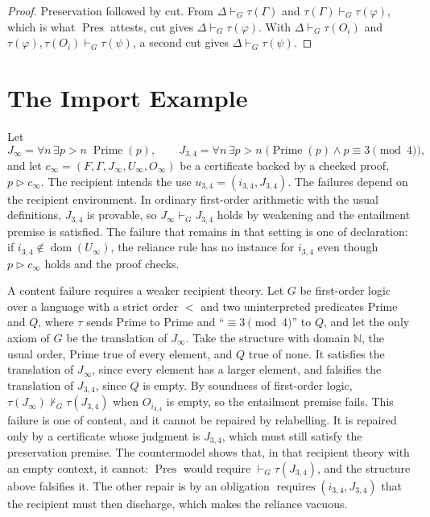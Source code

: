 \documentclass[11pt]{book}
\theoremstyle{definition}
\theoremstyle{remark}
\begin{document}
\begin{proof}
Preservation followed by cut. From $\Delta\vdash_G\tau(\Gamma)$ and $\tau(\Gamma)\vdash_G\tau(\varphi)$, which is what $\operatorname{Pres}$ attests, cut gives $\Delta\vdash_G\tau(\varphi)$. With $\Delta\vdash_G\tau(O_i)$ and $\tau(\varphi),\tau(O_i)\vdash_G\tau(\psi)$, a second cut gives $\Delta\vdash_G\tau(\psi)$.
\end{proof}

\section*{The Import Example}

Let
\[
J_\infty=\forall n\,\exists p>n\;\operatorname{Prime}(p),\qquad
J_{3,4}=\forall n\,\exists p>n\;\bigl(\operatorname{Prime}(p)\land p\equiv3\pmod4\bigr),
\]
and let $c_\infty=(F,\Gamma,J_\infty,U_\infty,O_\infty)$ be a certificate backed by a checked proof, $p\triangleright c_\infty$. The recipient intends the use $u_{3,4}=(i_{3,4},J_{3,4})$. The failures depend on the recipient environment. In ordinary first-order arithmetic with the usual definitions, $J_{3,4}$ is provable, so $J_\infty\vdash_G J_{3,4}$ holds by weakening and the entailment premise is satisfied. The failure that remains in that setting is one of declaration: if $i_{3,4}\notin\operatorname{dom}(U_\infty)$, the reliance rule has no instance for $i_{3,4}$ even though $p\triangleright c_\infty$ holds and the proof checks.

A content failure requires a weaker recipient theory. Let $G$ be first-order logic over a language with a strict order $<$ and two uninterpreted predicates $\mathrm{Prime}$ and $Q$, where $\tau$ sends $\mathrm{Prime}$ to $\mathrm{Prime}$ and ``$\equiv3\pmod4$'' to $Q$, and let the only axiom of $G$ be the translation of $J_\infty$. Take the structure with domain $\mathbb N$, the usual order, $\mathrm{Prime}$ true of every element, and $Q$ true of none. It satisfies the translation of $J_\infty$, since every element has a larger element, and falsifies the translation of $J_{3,4}$, since $Q$ is empty. By soundness of first-order logic, $\tau(J_\infty)\nvdash_G\tau(J_{3,4})$ when $O_{i_{3,4}}$ is empty, so the entailment premise fails. This failure is one of content, and it cannot be repaired by relabelling. It is repaired only by a certificate whose judgment is $J_{3,4}$, which must still satisfy the preservation premise. The countermodel shows that, in that recipient theory with an empty context, it cannot: $\operatorname{Pres}$ would require $\vdash_G\tau(J_{3,4})$, and the structure above falsifies it. The other repair is by an obligation $\operatorname{requires}(i_{3,4},J_{3,4})$ that the recipient must then discharge, which makes the reliance vacuous.
\end{document}
